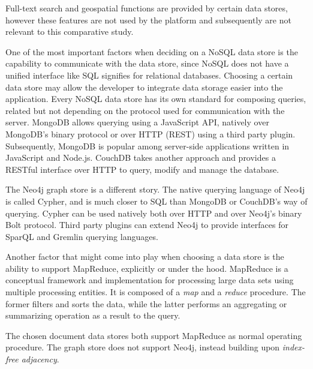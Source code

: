 Full-text search and geospatial functions are provided by certain data stores, however these features are not used by the platform and subsequently are not relevant to this comparative study.\\


\begin{landscape}
  
\end{landscape}

One of the most important factors when deciding on a NoSQL data store is the capability to communicate with the data store, since NoSQL does not have a unified interface like SQL signifies for relational databases.
Choosing a certain data store may allow the developer to integrate data storage easier into the application.
Every NoSQL data store has its own standard for composing queries, related but not depending on the protocol used for communication with the server.
MongoDB allows querying using a JavaScript API, natively over MongoDB's binary protocol or over HTTP (REST) using a third party plugin.
Subsequently, MongoDB is popular among server-side applications written in JavaScript and Node.js.
CouchDB takes another approach and provides a RESTful interface over HTTP to query, modify and manage the database.

The Neo4j graph store is a different story.
The native querying language of Neo4j is called Cypher, and is much closer to SQL than MongoDB or CouchDB's way of querying.
Cypher can be used natively both over HTTP and over Neo4j's binary Bolt protocol.
Third party plugins can extend Neo4j to provide interfaces for SparQL and Gremlin querying languages.

Another factor that might come into play when choosing a data store is the ability to support MapReduce, explicitly or under the hood.
MapReduce is a conceptual framework and implementation for processing large data sets using multiple processing entities.
It is composed of a \textit{map} and a \textit{reduce} procedure.
The former filters and sorts the data, while the latter performs an aggregating or summarizing operation as a result to the query.

The chosen document data stores both support MapReduce as normal operating procedure.
The graph store does not support Neo4j, instead building upon \textit{index-free adjacency}.

